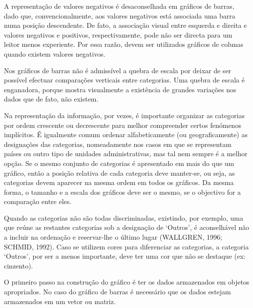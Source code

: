 A representação de valores negativos é desaconselhada em gráficos de barras, dado que, convencionalmente, aos valores negativos está associada uma barra numa posição descendente. De fato, a associação visual entre esquerda e direita e valores negativos e positivos, respectivamente, pode não ser directa para um leitor menos experiente. Por essa razão, devem ser utilizados gráficos de colunas quando existem valores negativos.\vskip0.3cm

Nos gráficos de barras não é admissível a quebra de escala por deixar de ser possível efectuar comparações verticais entre categorias. Uma quebra de escala é enganadora, porque mostra visualmente a existência de grandes variações nos dados que de fato, não existem.\vskip0.3cm 

Na representação da informação, por vezes, é importante organizar as categorias por ordem crescente ou decrescente para melhor compreender certos fenómenos implícitos. É igualmente comum ordenar alfabeticamente (ou geograficamente) as designações das categorias, nomeadamente nos casos em que se representam países ou outro tipo de unidades administrativas, mas tal nem sempre é a melhor opção. Se o mesmo conjunto de categorias é apresentado em mais do que um gráfico, então a posição relativa de cada categoria deve manter-se, ou seja, as categorias devem aparecer na mesma ordem em todos os gráficos. Da mesma forma, o tamanho e a escala dos gráficos deve ser o mesmo, se o objectivo for a comparação entre eles. \vskip0.3cm  

Quando as categorias não são todas discriminadas, existindo, por exemplo, uma que reúne as restantes categorias sob a designação de ‘Outros’, é aconselhável não a incluir na ordenação e reservar-lhe o último lugar (WALLGREN, 1996; SCHMID, 1992). Caso se utilizem cores para diferenciar as categorias, a categoria ‘Outros’, por ser a menos importante, deve ter uma cor que não se destaque (ex: cinzento). \vskip0.3cm

\inic O primeiro passo na construção do gráfico é ter os dados armazenados em objetos apropriados. No caso do gráfico de barras é necessário que os dados estejam armazenados em um vetor ou matriz.







